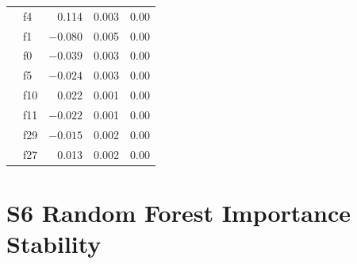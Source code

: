 \documentclass[10pt,letterpaper]{article}
\begin{document}
\begin{table}[!h]
\begin{tabular}{l l r r r}
 & f4 & 0.114 & 0.003 & 0.00 \\
 & f1 & $-0.080$ & 0.005 & 0.00 \\
 & f0 & $-0.039$ & 0.003 & 0.00 \\
 & f5 & $-0.024$ & 0.003 & 0.00 \\
 & f10 & 0.022 & 0.001 & 0.00 \\
 & f11 & $-0.022$ & 0.001 & 0.00 \\
 & f29 & $-0.015$ & 0.002 & 0.00 \\
 & f27 & 0.013 & 0.002 & 0.00 \\
\bottomrule
\end{tabular}
\end{table}

\clearpage
\section*{S6 Random Forest Importance Stability}
\end{document}
